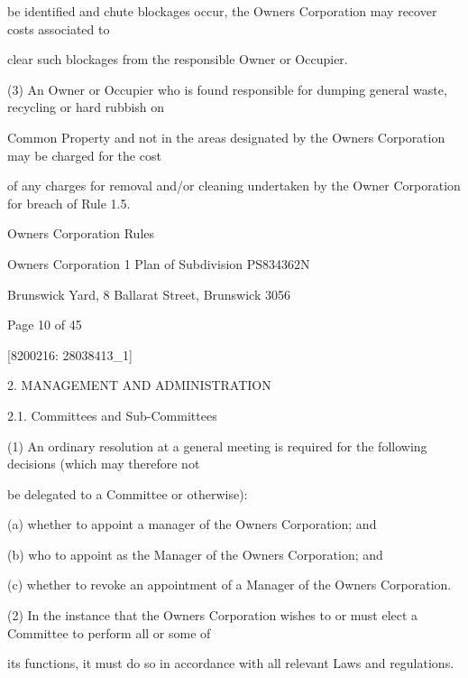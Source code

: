 \documentclass{article}
\begin{document}
{\fontsize{10.02}{1}be identified and chute blockages occur, the Owners Corporation may recover costs associated to }

{\fontsize{10.02}{1}clear such blockages from the responsible Owner or Occupier. }

{\fontsize{9.962}{1}(3) An Owner or Occupier who is found responsible for dumping general waste, recycling or hard rubbish on }

{\fontsize{10.02}{1}Common Property and not in the areas designated by the Owners Corporation may be charged for the cost }

{\fontsize{10.02}{1}of any charges for removal and/or cleaning undertaken by the Owner Corporation for breach of Rule 1.5. }


\newpage





{\fontsize{9}{1}Owners Corporation Rules }

{\fontsize{9}{1}Owners Corporation 1 Plan of Subdivision PS834362N }

{\fontsize{9}{1}Brunswick Yard, 8 Ballarat Street, Brunswick 3056 }


{\fontsize{9}{1}Page 10  of 45 }



{\fontsize{7.02}{1}[8200216: 28038413\_1] }

{\fontsize{9.99}{1}2. MANAGEMENT AND ADMINISTRATION }

{\fontsize{9.99}{1}2.1. Committees and Sub-Committees }


{\fontsize{9.962}{1}(1) An ordinary resolution at a general meeting is required for the following decisions (which may therefore not }

{\fontsize{10.02}{1}be delegated to a Committee or otherwise): }

{\fontsize{9.962}{1}(a) whether to appoint a manager of the Owners Corporation; and }

{\fontsize{9.962}{1}(b) who to appoint as the Manager of the Owners Corporation; and }

{\fontsize{9.962}{1}(c) whether to revoke an appointment of a Manager of the Owners Corporation. }

{\fontsize{9.962}{1}(2) In the instance that the Owners Corporation wishes to or must elect a Committee to perform all or some of }

{\fontsize{10.02}{1}its functions, it must do so in accordance with all relevant Laws and regulations. }
\end{document}
